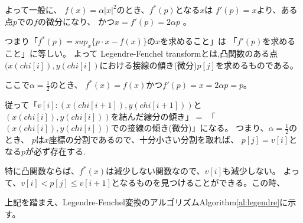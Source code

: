 よって一般に、 $f(x) = \alpha |x| ^2$のとき、$f^*(p)$となる$x$は $f'(p) = x$より、ある点$p$での$f$の微分になり、 
かつ$x = f'(p) = 2\alpha p$ 。

つまり「$f^*(p)= sup_x\{p \cdot x - f(x) \} $の$x$を求めること」は 「$f'(p)$を求めること」に等しい。
よって Legendre-Fenchel transformとは,凸関数のある点$(x(chi[i]), y(chi[i])$における接線の傾き(微分)$p[j]$を求めるものである。


ここで$\alpha = \frac{1}{2}$のとき、 $f^*(x) = f(x) かつf'(p) = x = 2\alpha p = p$。

従って「$v[i]: (x(chi[i+1]), y(chi[i+1]))$と$(x(chi[i]), y(chi[i]))$を結んだ線分の傾き」$=$ 「$(x(chi[i]), y(chi[i]))$での接線の傾き(微分)」になる。
つまり、$\alpha = \frac{1}{2}$のとき、 $p$は$x$座標の分割であるので、十分小さい分割を取れば、 $p[j] = v[i]$となる$p$が必ず存在する.

特に凸関数ならば、$f^*(x)$は減少しない関数なので、$v[i]$も減少しない。
よって、$v[i] < p[j] \leq v[i+1]$となるものを見つけることができる。この時、

\begin{center}
\end{center}


上記を踏まえ、Legendre-Fenchel変換のアルゴリズムAlgorithm\ref{al:legendre}に示す。

